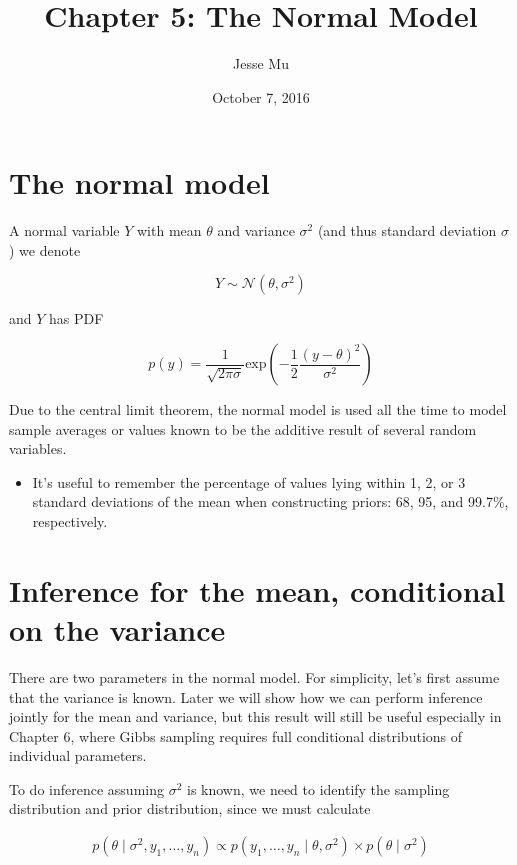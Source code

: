 \documentclass[]{article}
\title{Chapter 5: The Normal Model}
\author{Jesse Mu}
\date{October 7, 2016}
\providecommand{\tightlist}{%
  \setlength{\itemsep}{0pt}\setlength{\parskip}{0pt}}
\begin{document}
\maketitle

{
\setcounter{tocdepth}{2}
\tableofcontents
}
\hypertarget{the-normal-model}{%
\section{The normal model}\label{the-normal-model}}

A normal variable \(Y\) with mean \(\theta\) and variance \(\sigma^2\)
(and thus standard deviation \(\sigma\)) we denote

\[Y \sim \mathcal{N}(\theta, \sigma^2)\]

and \(Y\) has PDF

\[
p(y) = \frac{1}{\sqrt{2\pi\sigma}} \text{exp}\left(-\frac{1}{2} \frac{(y - \theta)^2}{\sigma^2}\right)
\]

Due to the central limit theorem, the normal model is used all the time
to model sample averages or values known to be the additive result of
several random variables.

\begin{itemize}
\tightlist
\item
  It's useful to remember the percentage of values lying within 1, 2, or
  3 standard deviations of the mean when constructing priors: 68, 95,
  and 99.7\%, respectively.
\end{itemize}

\hypertarget{inference-for-the-mean-conditional-on-the-variance}{%
\section{Inference for the mean, conditional on the
variance}\label{inference-for-the-mean-conditional-on-the-variance}}

There are two parameters in the normal model. For simplicity, let's
first assume that the variance is known. Later we will show how we can
perform inference jointly for the mean and variance, but this result
will still be useful especially in Chapter 6, where Gibbs sampling
requires full conditional distributions of individual parameters.

To do inference assuming \(\sigma^2\) is known, we need to identify the
sampling distribution and prior distribution, since we must calculate

\begin{align}
p(\theta \mid \sigma^2, y_1, \dots, y_n) \propto p(y_1, \dots, y_n \mid \theta, \sigma^2) \times p(\theta \mid \sigma^2)
\end{align}
\end{document}
